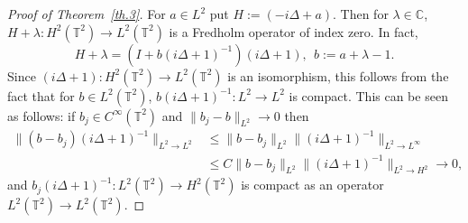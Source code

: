 \documentclass[10pt]{amsart}
\theoremstyle{definition}\newtheorem{defi}[theo]{Definition}\newtheorem{rema}[theo]{Remark}\newtheorem{exam}[theo]{Example}\newtheorem{exem}[theo]{Example}\newtheorem{nota}[theo]{Notation}
\newcommand{\CC}{{\mathbb C}}
\newcommand{\TT}{{\mathbb T}}
\begin{document}
\begin{proof}[Proof of Theorem~\ref{th.3}]
For $a \in L^2$ put $H := (- i \Delta +a)$. Then for $ \lambda \in \CC $, $ H + \lambda : H^2 (\TT^2) \to L^2 (\TT^2) $ is a Fredholm operator of index zero. In fact,
\[
H + \lambda = (I + b (i \Delta + 1)^{-1}) (i \Delta + 1), \ \ b:= a + \lambda - 1.
\]
Since $ (i \Delta + 1) :H^2 (\TT^2) \to L^2 (\TT^2) $ is an isomorphism, this follows from the fact that for $ b \in L^2 (\TT^2) $, $ b (i \Delta + 1)^{-1} : L^2 \to L^2 $ is compact. This can be seen as follows: if $ b_j \in C^\infty (\TT^2) $ and $ \| b_j - b\|_{L^2 } \to 0 $ then
\[
\begin{split} \| (b - b_j) (i \Delta +1)^{-1} \|_{ L^2 \to L^2 } & \leq
\| b - b_j \|_{ L^2 } \| (i \Delta + 1)^{-1} \|_{ L^2 \to L^\infty } \\
&
\leq C \| b - b_j \|_{ L^2 } \| (i \Delta + 1)^{-1} \|_{ L^2 \to H^2 }
\to 0,
\end{split}
\]
and $ b_j (i \Delta + 1)^{-1} : L^2 (\TT^2) \to H^2 (\TT^2) $ is compact as an operator $ L^2 (\TT^2)\to L^2 (\TT^2) $.



\end{proof}
\end{document}
